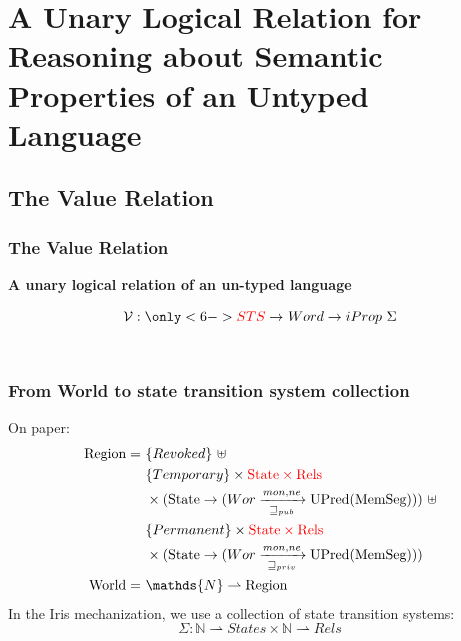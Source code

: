 \documentclass{beamer}
\newcommand{\bigsep}{\mathop{\scalebox{2.5}{\raisebox{-0.4ex}{$*$}}}}%
\begin{document}
\section{A Unary Logical Relation for Reasoning about Semantic Properties of an Untyped Language}

\subsection{The Value Relation}

\begin{frame}[fragile]
\frametitle{The Value Relation}
\begin{center}
\textbf{A unary logical relation of an un-typed language}
\end{center}

$$\mathcal{V} : \only<6->{{\color{red}STS} \rightarrow~} 
			Word \rightarrow iProp~\Sigma $$
\\[1em]

\uncover<2->{
$$  \mathcal{V}\only<6->{{\color{red} (\Sigma)}}((\text{\tiny{RW}},g),b,e,a) \triangleq~ \bigsep_{a \in [b,e]} \fbox{$\exists w, a \mapsto_a [RW] w * \mathcal{V}\only<5->{{\color{red} (\Sigma)}}(w)$}$$}


\end{frame}

\begin{frame}
\frametitle{From World to state transition system collection}
On paper: 
\begin{align*}
	\text{Region} =~&\{Revoked\}~\uplus \\
						     &\{Temporary\} \times {\color{red} \text{State} \times \text{Rels}} \\ 
						     &\times (\text{State} \rightarrow (Wor \xrightarrow[\sqsupseteq_{pub}]{mon, ne} \text{UPred(MemSeg)}))~\uplus \\
						     &\{Permanent\} \times {\color{red} \text{State} \times \text{Rels}}  \\ 
						     &\times (\text{State} \rightarrow (Wor \xrightarrow[\sqsupseteq_{priv}]{mon, ne} \text{UPred(MemSeg)})) \\
	\text{World} =~&\mathds{N} \rightharpoonup \text{Region}
\end{align*}
In the Iris mechanization, we use a collection of state transition systems: 
$$\Sigma: \mathds{N} \rightharpoonup States \times \mathds{N} \rightharpoonup Rels $$
	
\end{frame}
\end{document}
